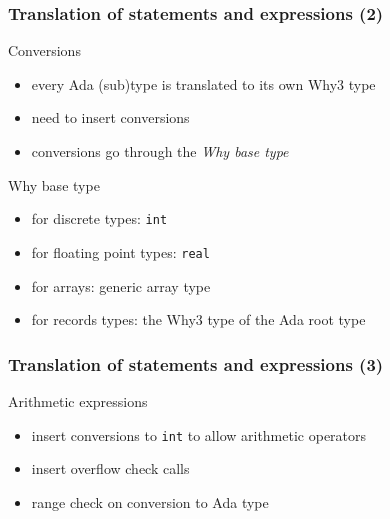 \documentclass{beamer}
\newenvironment{specialframe}{%
  \begin{frame}[fragile,environment=specialframe]}{\end{frame}}
\begin{document}
\begin{specialframe}\frametitle{Translation of statements and expressions (2) }
   \begin{block}{Conversions}
      \begin{itemize}
         \item every Ada (sub)type is translated to its own Why3 type
         \item need to insert conversions
         \item conversions go through the \emph{Why base type}
      \end{itemize}
   \end{block}
   \begin{block}{Why base type}
      \begin{itemize}
         \item for discrete types: \verb|int|
         \item for floating point types: \verb|real|
         \item for arrays: generic array type
         \item for records types: the Why3 type of the Ada root type
      \end{itemize}
   \end{block}
\end{specialframe}

\begin{specialframe}\frametitle{Translation of statements and expressions (3) }
   \begin{block}{Arithmetic expressions}
      \begin{itemize}
         \item insert conversions to \verb|int| to allow arithmetic operators
         \item insert overflow check calls
         \item range check on conversion to Ada type
      \end{itemize}
   \end{block}
\end{specialframe}
\end{document}
